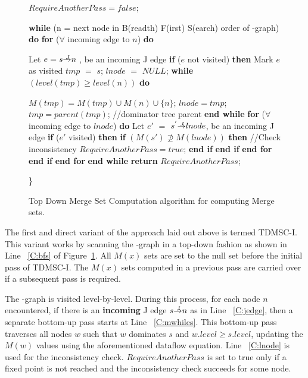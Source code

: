 {\begin{figure}[!ht]
\begin{minipage}[t]{5in}
\begin{code}
 $RequireAnotherPass=false$;

 {\bf while} (n = next node in B(readth) F(irst) S(earch) order of \DJ-graph) {\bf do} \label{C:bfs}
      {\bf for} ($\forall$ incoming edge to $n$) {\bf do} \label{C:jedge}

          Let $e = s \st{J} n$ , be an incoming J edge
          {\bf if} ($e$ not visited) {\bf then}
              Mark $e$ as visited 
              $tmp$ $=$ $s$;
              $lnode$ $=$ $NULL$;
              {\bf while} $(level(tmp)\ge level(n))$ {\bf do} \label{C:mwhiles}

                   $M(tmp)=M(tmp)\cup M(n)\cup \{n\}$;
                   $lnode=tmp$;
                   $tmp=parent(tmp)$; //dominator tree parent
              {\bf end while} \label{C:mwhilee}
              {\bf for} ($\forall$ incoming edge to $lnode$) {\bf do} \label{C:lnode}
                  Let $e'$ $=$ $s^{'} \st{J} lnode$, be an incoming J edge
                  {\bf if} ($e'$ visited) {\bf then}
                     {\bf if} $(M(s') \not\supseteq M(lnode))$ {\bf then} //Check inconsistency
                         $RequireAnotherPass = true$;
                     {\bf end if}
                  {\bf end if}
              {\bf end for}
          {\bf end if}
     {\bf end for}
 {\bf end while}
 {\bf return} $RequireAnotherPass$;
\end{code}
\}
\end{minipage}
\caption{Top Down Merge Set Computation algorithm for computing Merge sets.}
\label{F:tdmsc}
\end{figure} 

The first and direct variant of the approach laid out above is termed TDMSC-I. This variant works by scanning the \DJ-graph in a top-down fashion as shown in Line ~\ref{C:bfs}
of Figure~\ref{F:tdmsc}. All $M(x)$ sets are set to the null set before the initial pass of TDMSC-I. The $M(x)$ sets computed in a previous pass are carried over if a subsequent pass is required. 

The \DJ-graph is visited
level-by-level. During this process, for each node $n$ encountered, if there is an {\bf incoming}
J edge $s \st{J} n$ as in Line ~\ref{C:jedge}, then a separate bottom-up pass starts at 
Line ~\ref{C:mwhiles}. This bottom-up pass traverses all nodes $w$ such that $w$ dominates $s$ and $w.level \geq s.level$,
updating the $M(w)$ values using the aforementioned dataflow equation. Line ~\ref{C:lnode} is used for
the inconsistency check. $RequireAnotherPass$ is set to true only if a fixed point is not reached
and the inconsistency check succeeds for some node.

}

